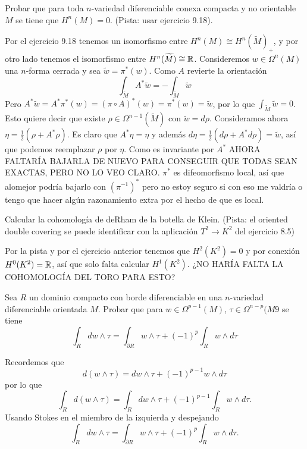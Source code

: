 \documentclass[twoside]{article}
\begin{document}
\begin{ejercicio}{10.4}
Probar que para toda $n$-variedad diferenciable conexa compacta y no orientable $M$ se tiene que $H^n(M)=0$. (Pista: usar ejercicio 9.18).
\end{ejercicio}
\begin{solucion}
Por el ejercicio 9.18 tenemos un isomorfismo entre $H^n(M)\cong H^n(\widetilde{M})_+$, y por otro lado tenemos el isomorfismo entre $H^n(\widetilde{M})\cong\mathbb{R}$. Consideremos $w\in\Omega^n(M)$ una $n$-forma cerrada y sea $\tilde{w}=\pi^*(w)$. Como $A$ revierte la orientación
\[
\int_{\widetilde{M}} A^*\tilde{w}=-\int_{\widetilde{M}} \tilde{w}
\]
Pero $A^*\tilde{w}=A^*\pi^*(w)=(\pi\circ A)^*(w)=\pi^*(w)=\tilde{w}$, por lo que $\int_{\widetilde{M}} \tilde{w}=0$. Esto quiere decir que existe $\rho\in\Omega^{n-1}(\widetilde{M})$ con $\tilde{w}=d\rho$. Consideramos ahora $\eta=\frac{1}{2}(\rho+A^*\rho)$. Es claro que $A^*\eta=\eta$ y además $d\eta=\frac{1}{2}(d\rho+A^*d\rho)=\tilde{w}$, así que podemos reemplazar $\rho$ por $\eta$. Como es invariante por $A^*$ AHORA FALTARÍA BAJARLA DE NUEVO PARA CONSEGUIR QUE TODAS SEAN EXACTAS, PERO NO LO VEO CLARO. $\pi^*$ es difeomorfismo local, así que alomejor podría bajarlo con $(\pi^{-1})^*$ pero no estoy seguro si con eso me valdría o tengo que hacer algún razonamiento extra por el hecho de que es local.
\end{solucion}

\newpage

\begin{ejercicio}{10.5}
Calcular la cohomología de deRham de la botella de Klein. (Pista: el oriented double covering se puede identificar con la aplicación $T^2\to K^2$ del ejercicio 8.5)
\end{ejercicio}
\begin{solucion}
Por la pista y por el ejercicio anterior tenemos que $H^2(K^2)=0$ y por conexión $H^0(K^2)=\mathbb{R}$, así que solo falta calcular $H^1(K^2)$. 
¿NO HARÍA FALTA LA COHOMOLOGÍA DEL TORO PARA ESTO?
\end{solucion}
\newpage

\begin{ejercicio}{10.6}
Sea $R$ un dominio compacto con borde diferenciable en una $n$-variedad diferenciable orientada $M$. Probar que para $w\in\Omega^{p-1}(M)$, $\tau\in\Omega^{n-p}(M9$ se tiene
\[
\int_R dw\land \tau=\int_{\partial R}w\land\tau+(-1)^p\int_R w\land d\tau
\]
\end{ejercicio}
\begin{solucion}
Recordemos que 
\[
d(w\land\tau)=dw\land \tau +(-1)^{p-1} w\land d\tau
\]
por lo que
\[
\int_R d(w\land\tau)=\int_R dw\land \tau +(-1)^{p-1}\int_R w\land d\tau.
\]
Usando Stokes en el miembro de la izquierda y despejando
\[
\int_R dw\land \tau=\int_{\partial R}w\land\tau+(-1)^p\int_R w\land d\tau.
\]
\end{solucion}
\end{document}
